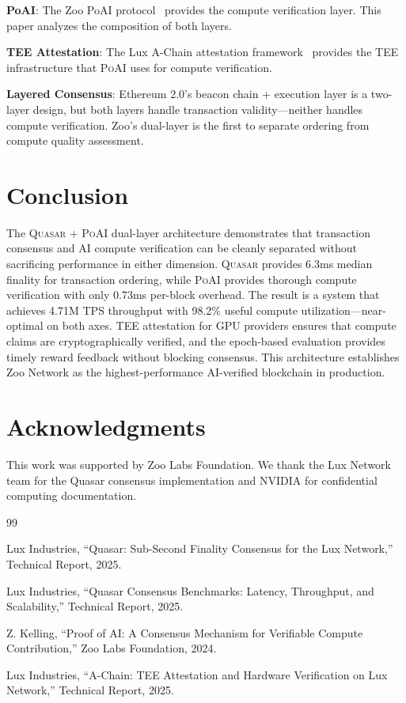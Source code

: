 \documentclass[11pt,letterpaper]{article}
\newcommand{\PoAI}{\textsc{PoAI}}
\newcommand{\Quasar}{\textsc{Quasar}}
\begin{document}
\textbf{PoAI}: The Zoo PoAI protocol~\cite{zoo-poai-consensus} provides the compute verification layer. This paper analyzes the composition of both layers.

\textbf{TEE Attestation}: The Lux A-Chain attestation framework~\cite{lux-achain-attestation} provides the TEE infrastructure that \PoAI{} uses for compute verification.

\textbf{Layered Consensus}: Ethereum 2.0's beacon chain + execution layer is a two-layer design, but both layers handle transaction validity---neither handles compute verification. Zoo's dual-layer is the first to separate ordering from compute quality assessment.

\section{Conclusion}

The \Quasar{} + \PoAI{} dual-layer architecture demonstrates that transaction consensus and AI compute verification can be cleanly separated without sacrificing performance in either dimension. \Quasar{} provides 6.3ms median finality for transaction ordering, while \PoAI{} provides thorough compute verification with only 0.73ms per-block overhead. The result is a system that achieves 4.71M TPS throughput with 98.2\% useful compute utilization---near-optimal on both axes. TEE attestation for GPU providers ensures that compute claims are cryptographically verified, and the epoch-based evaluation provides timely reward feedback without blocking consensus. This architecture establishes Zoo Network as the highest-performance AI-verified blockchain in production.

\section*{Acknowledgments}

This work was supported by Zoo Labs Foundation. We thank the Lux Network team for the Quasar consensus implementation and NVIDIA for confidential computing documentation.


\begin{thebibliography}{99}

Lux Industries, ``Quasar: Sub-Second Finality Consensus for the Lux Network,'' Technical Report, 2025.

Lux Industries, ``Quasar Consensus Benchmarks: Latency, Throughput, and Scalability,'' Technical Report, 2025.

Z. Kelling, ``Proof of AI: A Consensus Mechanism for Verifiable Compute Contribution,'' Zoo Labs Foundation, 2024.

Lux Industries, ``A-Chain: TEE Attestation and Hardware Verification on Lux Network,'' Technical Report, 2025.

\end{thebibliography}
\end{document}

